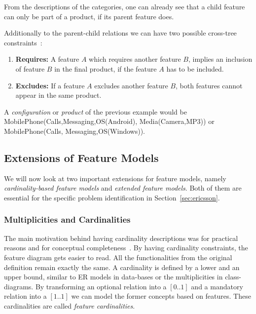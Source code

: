 From the descriptions of the categories, one can already see that a child feature can only be part of a product, if its parent feature does. 

Additionally to the parent-child relations we can have two possible cross-tree constraints~\cite{automated-test-data-generation-feature-models}:

\begin{enumerate}
 \item \textbf{Requires:} A feature $A$ which requires another feature $B$, implies an inclusion of feature $B$ in the final product, if the feature $A$ has to be included.
 \item \textbf{Excludes:} If a feature $A$ excludes another feature $B$, both features cannot appear in the same product.
\end{enumerate}

A \emph{configuration} or \emph{product} of the previous example would be \textsf{MobilePhone(Calls,Messaging,OS(Android), Media(Camera,MP3))} or \textsf{MobilePhone(Calls, Messaging,OS(Windows))}.




\subsection*{Extensions of Feature Models}

We will now look at two important extensions for feature models, namely \emph{cardinality-based feature models} and \emph{extended feature models}. Both of them are essential for the specific problem identification in Section~\ref{sec:ericsson}.

\subsubsection*{Multiplicities and Cardinalities}

The main motivation behind having cardinality descriptions was for practical reasons and for conceptual completeness~\cite{feature-model-survey}. By having cardinality constraints, the feature diagram gets easier to read. All the functionalities from the original definition remain exactly the same. A cardinality is defined by a lower and an upper bound, similar to ER models in 
data-bases or the multiplicities in class-diagrams.
By transforming an optional relation into a $[0..1]$ and a mandatory relation into a $[1..1]$ we can model the former concepts based on features. These cardinalities are called \emph{feature cardinalities}.


